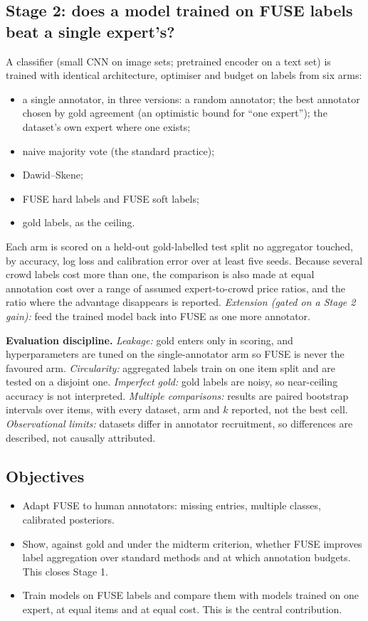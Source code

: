 \documentclass[10pt]{article}
\newcommand{\secrule}[1]{\par\vspace{8pt}{\noindent\color{navy}\bfseries\fontsize{14}{16}\selectfont #1\par}\vspace{-5pt}{\color{navy}\rule{\linewidth}{0.7pt}}\par\vspace{1pt}}
\begin{document}
\subsection*{Stage 2: does a model trained on FUSE labels beat a single expert's?}

A classifier (small CNN on image sets; pretrained encoder on a text set) is trained with identical architecture, optimiser and budget on labels from six arms:
\begin{itemize}
\item a single annotator, in three versions: a random annotator; the best annotator chosen by gold agreement (an optimistic bound for ``one expert''); the dataset's own expert where one exists;
\item naive majority vote (the standard practice);
\item Dawid--Skene;
\item FUSE hard labels and FUSE soft labels;
\item gold labels, as the ceiling.
\end{itemize}
Each arm is scored on a held-out gold-labelled test split no aggregator touched, by accuracy, log loss and calibration error over at least five seeds. Because several crowd labels cost more than one, the comparison is also made at equal annotation cost over a range of assumed expert-to-crowd price ratios, and the ratio where the advantage disappears is reported. \emph{Extension (gated on a Stage 2 gain):} feed the trained model back into FUSE as one more annotator.

\textbf{Evaluation discipline.} \emph{Leakage:} gold enters only in scoring, and hyperparameters are tuned on the single-annotator arm so FUSE is never the favoured arm. \emph{Circularity:} aggregated labels train on one item split and are tested on a disjoint one. \emph{Imperfect gold:} gold labels are noisy, so near-ceiling accuracy is not interpreted. \emph{Multiple comparisons:} results are paired bootstrap intervals over items, with every dataset, arm and $k$ reported, not the best cell. \emph{Observational limits:} datasets differ in annotator recruitment, so differences are described, not causally attributed.

\secrule{Objectives \& Deliverables}

\subsection*{Objectives}
\begin{itemize}
\item Adapt FUSE to human annotators: missing entries, multiple classes, calibrated posteriors.
\item Show, against gold and under the midterm criterion, whether FUSE improves label aggregation over standard methods and at which annotation budgets. This closes Stage 1.
\item Train models on FUSE labels and compare them with models trained on one expert, at equal items and at equal cost. This is the central contribution.
\end{itemize}
\end{document}
